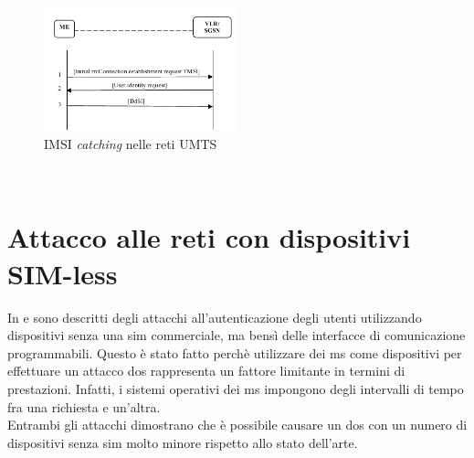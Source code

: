 \begin{figure}[h]
    \centering
    \includegraphics[width=0.5\textwidth]{images/imsi-catch-umts.png}
    \caption{IMSI \textit{catching} nelle reti UMTS\cite{dos-imsi}}
\end{figure}\\

\clearpage

\section{Attacco alle reti con dispositivi SIM-less}
In \cite{umts-dos} e \cite{gsm-dos-simless} sono descritti degli attacchi all'autenticazione degli utenti utilizzando dispositivi senza una \gls{sim} commerciale, ma bensì delle interfacce di comunicazione 
programmabili. Questo è stato fatto perchè utilizzare dei \gls{ms} come dispositivi per effettuare un attacco \gls{dos} rappresenta un fattore limitante in termini di prestazioni. Infatti, 
i sistemi operativi dei \gls{ms} impongono degli intervalli di tempo fra una richiesta e un'altra.\\
Entrambi gli attacchi dimostrano che è possibile causare un \gls{dos} con un numero di dispositivi senza \gls{sim} molto minore rispetto allo stato dell'arte. 
